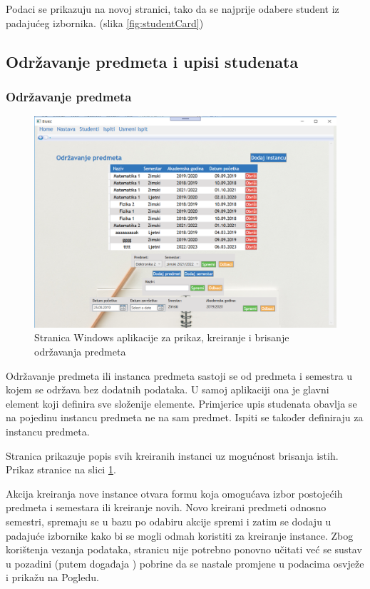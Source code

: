 \documentclass[times, utf8, diplomski]{fer}
\begin{document}
Podaci se prikazuju na novoj stranici, tako da se najprije odabere student iz padajućeg izbornika. (slika \ref{fig:studentCard})


\subsection{Održavanje predmeta i upisi studenata}

\subsubsection{Održavanje predmeta}
\begin{figure}[htb]
\centering
\includegraphics[width=12cm]{courseInstances.PNG}
\caption{Stranica Windows aplikacije za prikaz, kreiranje i brisanje održavanja predmeta}
\label{fig:courses}
\end{figure}

Održavanje predmeta ili instanca predmeta sastoji se od predmeta i semestra u kojem se održava bez dodatnih podataka. U samoj aplikaciji ona je glavni element koji definira sve složenije elemente. Primjerice upis studenata obavlja se na pojedinu instancu predmeta ne na sam predmet. Ispiti se također definiraju za instancu predmeta.

Stranica prikazuje popis svih kreiranih instanci uz mogućnost brisanja istih. Prikaz stranice na slici \ref{fig:courses}.

Akcija kreiranja nove instance otvara formu koja omogućava izbor postojećih predmeta i semestara ili kreiranje novih. Novo kreirani predmeti odnosno semestri, spremaju se u bazu po odabiru akcije spremi i zatim se dodaju u padajuće izbornike kako bi se mogli odmah koristiti za kreiranje instance. Zbog korištenja vezanja podataka, stranicu nije potrebno ponovno učitati već se sustav u pozadini (putem događaja ) pobrine da se nastale promjene u podacima osvježe i prikažu na Pogledu.
\end{document}
